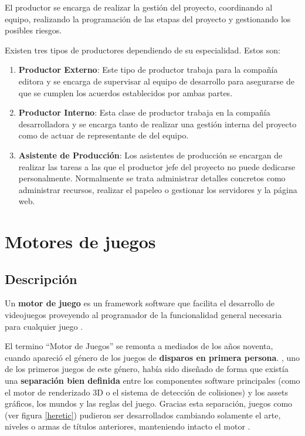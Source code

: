 El productor se encarga de realizar la gestión del proyecto, coordinando al equipo, realizando la programación de las etapas del proyecto y gestionando los posibles riesgos.

Existen tres tipos de productores dependiendo de su especialidad. Estos son:
\begin{enumerate}
\item \textbf{Productor Externo}: Este tipo de productor trabaja para la compañía editora y se encarga de supervisar al equipo de desarrollo para asegurarse de que se cumplen los acuerdos establecidos por ambas partes.
\item \textbf{Productor Interno}: Esta clase de productor trabaja en la compañía desarrolladora y se encarga tanto de realizar una gestión interna del proyecto como de actuar de representante de del equipo.
\item \textbf{Asistente de Producción}: Los asistentes de producción se encargan de realizar las tareas a las que el productor jefe del proyecto no puede dedicarse personalmente. Normalmente se trata administrar detalles concretos como administrar recursos, realizar el papeleo o gestionar los servidores y la página web.
\end{enumerate}

\section{Motores de juegos}
\subsection{Descripción}
Un \textbf{motor de juego} es un framework software que facilita el desarrollo de videojuegos proveyendo al programador de la funcionalidad general necesaria para cualquier juego \cite{game_engine}.

El termino ``Motor de Juegos'' se remonta a mediados de los años noventa, cuando apareció el género de los juegos de \textbf{disparos en primera persona}. , uno de los primeros juegos de este género, había sido diseñado de forma que existía una \textbf{separación bien definida} entre los componentes software principales (como el motor de renderizado 3D o el sistema de detección de colisiones) y los assets gráficos, los mundos y las reglas del juego. Gracias esta separación, juegos como  (ver figura \ref{heretic}) pudieron ser desarrollados cambiando solamente el arte, niveles o armas de títulos anteriores, manteniendo intacto el motor \cite{game_engine_architecture}. 

